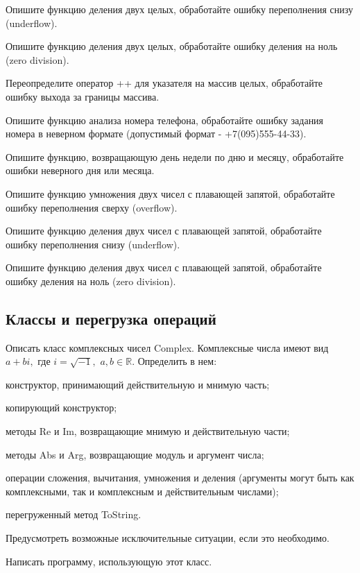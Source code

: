 \task Опишите функцию деления двух целых, обработайте ошибку переполнения снизу (underflow).

\task Опишите функцию деления двух целых, обработайте ошибку деления на ноль (zero division).

\task Переопределите оператор ++ для указателя на массив целых, обработайте ошибку выхода за границы массива.

\task Опишите функцию анализа номера телефона, обработайте ошибку задания номера в неверном формате (допустимый формат - +7(095)555-44-33).

\task 

\task Опишите функцию, возвращающую день недели по дню и месяцу, обработайте ошибки неверного дня или месяца.

\task Опишите функцию умножения двух чисел с плавающей запятой, обработайте ошибку переполнения сверху (overflow).

\task Опишите функцию деления двух чисел с плавающей запятой, обработайте ошибку переполнения снизу (underflow).

\task Опишите функцию деления двух чисел с плавающей запятой, обработайте ошибку деления на ноль (zero division).


\subsection{Классы и перегрузка операций}

\task Описать класс комплексных чисел Complex. Комплексные числа имеют
вид $a+bi,$ где $i=\sqrt{-1},$ $a,b \in \mathbb{R}$. Определить в нем:
\begin{itemize*}
\item конструктор, принимающий действительную и мнимую часть;
\item копирующий конструктор;
\item методы Re и Im, возвращающие мнимую и действительную части;
\item методы Abs и Arg, возвращающие модуль и аргумент числа;
\item операции сложения, вычитания, умножения и деления (аргументы
  могут быть как комплексными, так и комплексным и действительным
  числами);
\item перегруженный метод ToString.
\end{itemize*}

Предусмотреть возможные исключительные ситуации, если это необходимо.

Написать программу, использующую этот класс.

